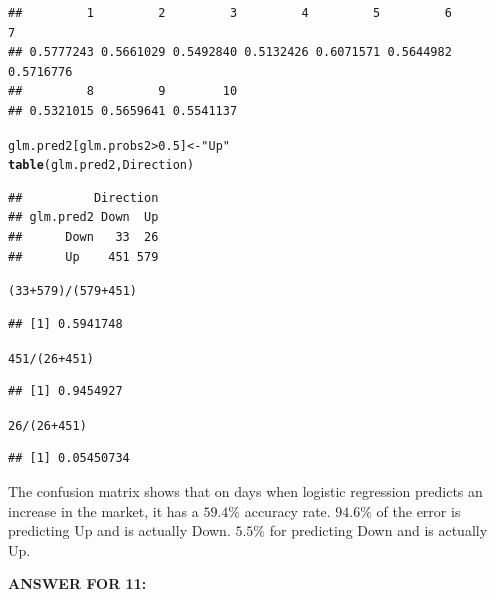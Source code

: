 \documentclass{article}\usepackage[]{graphicx}\usepackage[]{color}
\makeatletter
\newcommand{\hlnum}[1]{\textcolor[rgb]{0.686,0.059,0.569}{#1}}%
\newcommand{\hlstr}[1]{\textcolor[rgb]{0.192,0.494,0.8}{#1}}%
\newcommand{\hlopt}[1]{\textcolor[rgb]{0,0,0}{#1}}%
\newcommand{\hlstd}[1]{\textcolor[rgb]{0.345,0.345,0.345}{#1}}%
\newcommand{\hlkwb}[1]{\textcolor[rgb]{0.69,0.353,0.396}{#1}}%
\newcommand{\hlkwd}[1]{\textcolor[rgb]{0.737,0.353,0.396}{\textbf{#1}}}%
\newenvironment{kframe}{%
 \def\at@end@of@kframe{}%
 \ifinner\ifhmode%
  \def\at@end@of@kframe{\end{minipage}}%
  \begin{minipage}{\columnwidth}%
 \fi\fi%
 \def\FrameCommand##1{\hskip\@totalleftmargin \hskip-\fboxsep
 \colorbox{shadecolor}{##1}\hskip-\fboxsep
     \hskip-\linewidth \hskip-\@totalleftmargin \hskip\columnwidth}%
 \MakeFramed {\advance\hsize-\width
   \@totalleftmargin\z@ \linewidth\hsize
   \@setminipage}}%
 {\par\unskip\endMakeFramed%
 \at@end@of@kframe}
\newenvironment{knitrout}{}{} %
\makeatother
\begin{document}
\begin{enumerate}[(a)]
\begin{knitrout}
\begin{kframe}
\begin{verbatim}
##         1         2         3         4         5         6         7 
## 0.5777243 0.5661029 0.5492840 0.5132426 0.6071571 0.5644982 0.5716776 
##         8         9        10 
## 0.5321015 0.5659641 0.5541137
\end{verbatim}
\begin{alltt}
\hlstd{glm.pred2[glm.probs2}\hlopt{>}\hlnum{0.5}\hlstd{]}\hlkwb{<-}\hlstr{"Up"}
\hlkwd{table}\hlstd{(glm.pred2,Direction)}
\end{alltt}
\begin{verbatim}
##          Direction
## glm.pred2 Down  Up
##      Down   33  26
##      Up    451 579
\end{verbatim}
\begin{alltt}
\hlstd{(}\hlnum{33}\hlopt{+}\hlnum{579}\hlstd{)}\hlopt{/}\hlstd{(}\hlnum{579}\hlopt{+}\hlnum{451}\hlstd{)}
\end{alltt}
\begin{verbatim}
## [1] 0.5941748
\end{verbatim}
\begin{alltt}
\hlnum{451}\hlopt{/}\hlstd{(}\hlnum{26}\hlopt{+}\hlnum{451}\hlstd{)}
\end{alltt}
\begin{verbatim}
## [1] 0.9454927
\end{verbatim}
\begin{alltt}
\hlnum{26}\hlopt{/}\hlstd{(}\hlnum{26}\hlopt{+}\hlnum{451}\hlstd{)}
\end{alltt}
\begin{verbatim}
## [1] 0.05450734
\end{verbatim}
\end{kframe}
\end{knitrout}

The confusion matrix shows that on days when logistic regression predicts an increase in the market, it has a $59.4\%$ accuracy rate. $94.6\%$ of the error is predicting Up and is actually Down. $5.5\%$ for predicting Down and is actually Up.
\end{enumerate}

\textbf{ANSWER FOR 11:} \\
\end{document}
